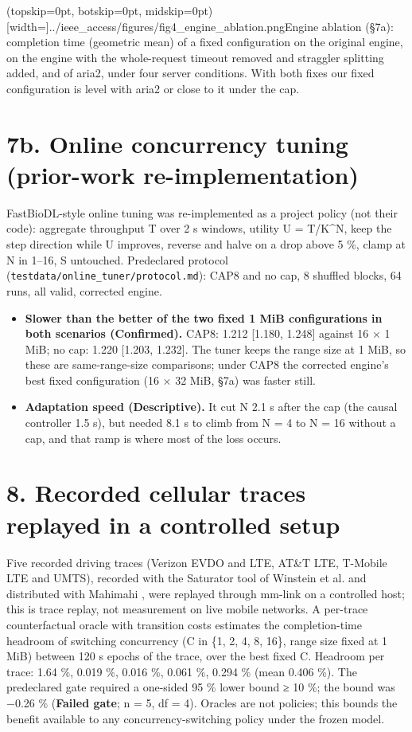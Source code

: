 \documentclass{ieeeaccess}
\begin{document}
\Figure[t!](topskip=0pt, botskip=0pt, midskip=0pt)[width=\columnwidth]{../ieee_access/figures/fig4_engine_ablation.png}{Engine ablation (§7a): completion time (geometric mean) of a fixed configuration on the original engine, on the engine with the whole-request timeout removed and straggler splitting added, and of aria2, under four server conditions. With both fixes our fixed configuration is level with aria2 or close to it under the cap.}

\section*{7b. Online concurrency tuning (prior-work re-implementation)}

FastBioDL-style online tuning \cite{swargo2025fastbiodl} was re-implemented as a project policy (not their code): aggregate throughput T over 2 s windows, utility U = T/K\textasciicircum{}N, keep the step direction while U improves, reverse and halve on a drop above 5 \%, clamp at N in 1–16, S untouched. Predeclared protocol (\texttt{testdata/\allowbreak{}online\_tuner/\allowbreak{}protocol.md}): CAP8 and no cap, 8 shuffled blocks, 64 runs, all valid, corrected engine.


\begin{itemize}
\item \textbf{Slower than the better of the two fixed 1 MiB configurations in both scenarios (Confirmed).} CAP8: 1.212 [1.180, 1.248] against 16 × 1 MiB; no cap: 1.220 [1.203, 1.232]. The tuner keeps the range size at 1 MiB, so these are same-range-size comparisons; under CAP8 the corrected engine's best fixed configuration (16 × 32 MiB, §7a) was faster still.
\item \textbf{Adaptation speed (Descriptive).} It cut N 2.1 s after the cap (the causal controller 1.5 s), but needed 8.1 s to climb from N = 4 to N = 16 without a cap, and that ramp is where most of the loss occurs.
\end{itemize}

\section*{8. Recorded cellular traces replayed in a controlled setup}

Five recorded driving traces (Verizon EVDO and LTE, AT\&T LTE, T-Mobile LTE and UMTS), recorded with the Saturator tool of Winstein et al. \cite{winstein2013sprout} and distributed with Mahimahi \cite{netravali2015mahimahi}, were replayed through mm-link on a controlled host; this is trace replay, not measurement on live mobile networks. A per-trace counterfactual oracle with transition costs estimates the completion-time headroom of switching concurrency (C in \{1, 2, 4, 8, 16\}, range size fixed at 1 MiB) between 120 s epochs of the trace, over the best fixed C. Headroom per trace: 1.64 \%, 0.019 \%, 0.016 \%, 0.061 \%, 0.294 \% (mean 0.406 \%). The predeclared gate required a one-sided 95 \% lower bound ≥ 10 \%; the bound was −0.26 \% (\textbf{Failed gate}; n = 5, df = 4). Oracles are not policies; this bounds the benefit available to any concurrency-switching policy under the frozen model.
\end{document}
